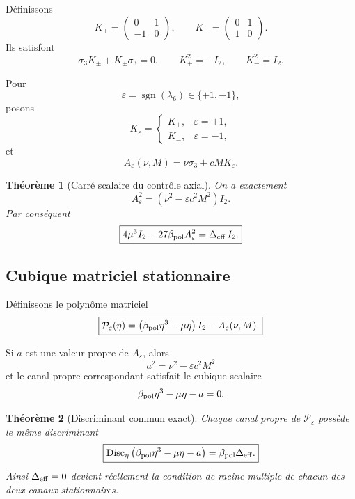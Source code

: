 \documentclass[11pt,a4paper]{article}
\newtheorem{theorem}{Théorème}[section]
\begin{document}
Définissons
\[
K_+
=
\begin{pmatrix}
0&1\\
-1&0
\end{pmatrix},
\qquad
K_-
=
\begin{pmatrix}
0&1\\
1&0
\end{pmatrix}.
\]
Ils satisfont
\[
\sigma_3K_\pm+K_\pm\sigma_3=0,
\qquad
K_+^2=-I_2,
\qquad
K_-^2=I_2.
\]

Pour
\[
\varepsilon=\operatorname{sgn}(\lambda_6)\in\{+1,-1\},
\]
posons
\[
K_\varepsilon
=
\begin{cases}
K_+,&\varepsilon=+1,\\
K_-,&\varepsilon=-1,
\end{cases}
\]
et
\begin{equation}\label{eq:v22-Acontrol}
\boxed{
A_\varepsilon(\nu,M)
=
\nu\sigma_3+cM K_\varepsilon.
}
\end{equation}

\begin{theorem}[Carré scalaire du contrôle axial]\label{thm:v22-A-square}
On a exactement
\[
\boxed{
A_\varepsilon^2
=
\left(
\nu^2-\varepsilon c^2M^2
\right)I_2.}
\]
Par conséquent
\[
\boxed{
4\mu^3I_2
-
27\beta_{\rm pol}A_\varepsilon^2
=
\Delta_{\rm eff}\,I_2.}
\]
\end{theorem}

\subsection{Cubique matriciel stationnaire}

Définissons le polynôme matriciel
\begin{equation}\label{eq:v22-matrix-cubic}
\boxed{
\mathcal P_\varepsilon(\eta)
=
\left(
\beta_{\rm pol}\eta^3-\mu\eta
\right)I_2
-
A_\varepsilon(\nu,M).
}
\end{equation}

Si $a$ est une valeur propre de $A_\varepsilon$, alors
\[
a^2
=
\nu^2-\varepsilon c^2M^2
\]
et le canal propre correspondant satisfait le cubique scalaire
\[
\beta_{\rm pol}\eta^3-\mu\eta-a=0.
\]

\begin{theorem}[Discriminant commun exact]\label{thm:v22-common-discriminant}
Chaque canal propre de $\mathcal P_\varepsilon$ possède le même discriminant
\[
\boxed{
\operatorname{Disc}_\eta
\left(
\beta_{\rm pol}\eta^3-\mu\eta-a
\right)
=
\beta_{\rm pol}\Delta_{\rm eff}.}
\]
Ainsi $\Delta_{\rm eff}=0$ devient réellement la condition de racine multiple de chacun des deux canaux stationnaires.
\end{theorem}
\end{document}
